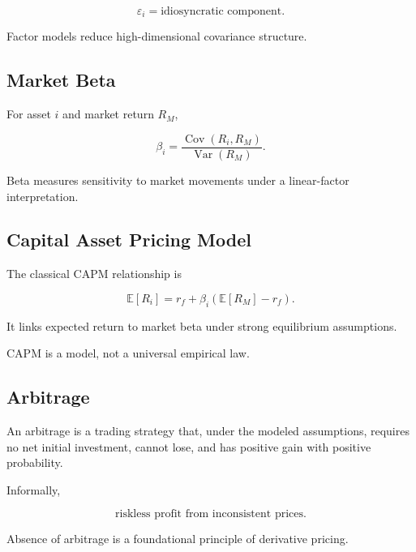 \[
\varepsilon_i
=
\text{idiosyncratic component}.
\]

Factor models reduce high-dimensional covariance structure.

\subsection{Market Beta}
\label{subsec:market-beta}

For asset \(i\) and market return \(R_M\),

\[
\boxed{
\beta_i
=
\frac{
\operatorname{Cov}(R_i,R_M)
}{
\operatorname{Var}(R_M)
}.
}
\]

Beta measures sensitivity to market movements under a linear-factor
interpretation.

\subsection{Capital Asset Pricing Model}
\label{subsec:capital-asset-pricing-model}

The classical CAPM relationship is

\[
\boxed{
\mathbb{E}[R_i]
=
r_f
+
\beta_i
\left(
\mathbb{E}[R_M]-r_f
\right).
}
\]

It links expected return to market beta under strong equilibrium assumptions.

CAPM is a model, not a universal empirical law.

\subsection{Arbitrage}
\label{subsec:financial-arbitrage}

An arbitrage is a trading strategy that, under the modeled assumptions,
requires no net initial investment, cannot lose, and has positive gain with
positive probability.

Informally,

\[
\boxed{
\text{riskless profit from inconsistent prices}.
}
\]

Absence of arbitrage is a foundational principle of derivative pricing.


